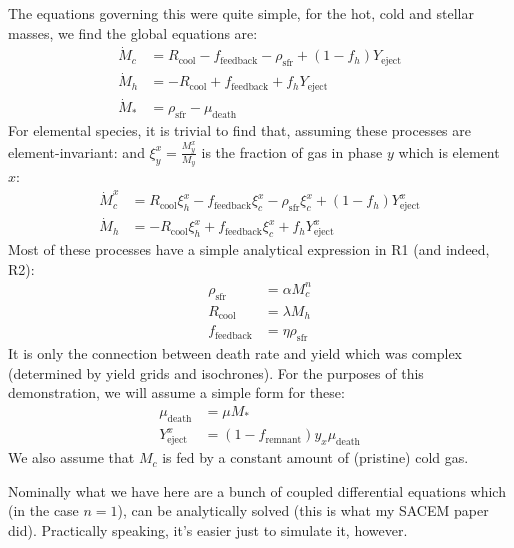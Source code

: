 \documentclass[a4paper,11pt]{article}
\begin{document}
		The equations governing this were quite simple, for the hot, cold and stellar masses, we find the global equations are:
		\begin{align}
			\dot{M}_c &= R_\text{cool} - f_\text{feedback} - \rho_\text{sfr} + (1-f_h) Y_\text{eject}
			\\
			\dot{M}_h &= -R_\text{cool} + f_\text{feedback} + f_h Y_\text{eject}
			\\
			\dot{M}_* & = \rho_\text{sfr} - \mu_\text{death}
		\end{align}
		For elemental species, it is trivial to find that, assuming these processes are element-invariant: and $\xi_y^x = \frac{M_y^x}{M_y}$ is the fraction of gas in phase $y$ which is element $x$:
		\begin{align}
			\dot{M}_c^x &= R_\text{cool}\xi_h^x - f_\text{feedback}\xi_c^x - \rho_\text{sfr}\xi_c^x + (1-f_h) Y^x_\text{eject}
			\\
			\dot{M}_h &= -R_\text{cool}\xi_h^x  + f_\text{feedback}\xi_c^x  + f_h Y^x_\text{eject}
		\end{align}
		Most of these processes have a simple analytical expression in R1 (and indeed, R2):
		\begin{align}
			\rho_\text{sfr} &= \alpha M_c^n
			\\
			R_\text{cool} & = \lambda M_h
			\\
			f_\text{feedback} & = \eta \rho_\text{sfr}
		\end{align}
		It is only the connection between death rate and yield which was complex (determined by yield grids and isochrones). For the purposes of this demonstration, we will assume a simple form for these:
		\begin{align}
			\mu_\text{death} & = \mu M_*
			\\
			Y^x_\text{eject} & = (1-f_\text{remnant}) y_x \mu_\text{death}
		\end{align}
		We also assume that $M_c$ is fed by a constant amount of (pristine) cold gas. 

		Nominally what we have here are a bunch of coupled differential equations which (in the case $n=1$), can be analytically solved (this is what my SACEM paper did). Practically speaking, it's easier just to simulate it, however.
\end{document}
